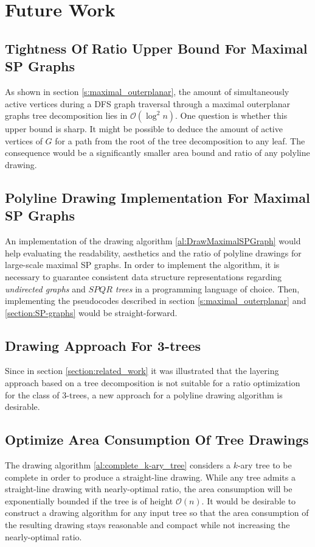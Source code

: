 \section{Future Work}\label{section:future_work}

\subsection*{Tightness Of Ratio Upper Bound For Maximal SP Graphs}

As shown in section \ref{s:maximal_outerplanar}, the amount of simultaneously active vertices during a DFS graph traversal through a maximal outerplanar graphs tree decomposition lies in $\mathcal{O}(\log^2 n)$. One question is whether this upper bound is sharp. It might be possible to deduce the amount of active vertices of $G$ for a path from the root of the tree decomposition to any leaf. The consequence would be a significantly smaller area bound and ratio of any polyline drawing.

\subsection*{Polyline Drawing Implementation For Maximal SP Graphs}

An implementation of the drawing algorithm \ref{al:DrawMaximalSPGraph} would help evaluating the readability, aesthetics and the ratio of polyline drawings for large-scale maximal SP graphs. In order to implement the algorithm, it is necessary to guarantee consistent data structure representations regarding \emph{undirected graphs} and \emph{$SPQR$ trees} in a programming language of choice. Then, implementing the pseudocodes described in section \ref{s:maximal_outerplanar} and \ref{section:SP-graphs} would be straight-forward.

\subsection*{Drawing Approach For 3-trees}

Since in section \ref{section:related_work} it was illustrated that the layering approach based on a tree decomposition is not suitable for a ratio optimization for the class of 3-trees, a new approach for a polyline drawing algorithm is desirable.

\subsection*{Optimize Area Consumption Of Tree Drawings}

The drawing algorithm \ref{al:complete_k-ary_tree} considers a $k$-ary tree to be complete in order to produce a straight-line drawing. While any tree admits a straight-line drawing with nearly-optimal ratio, the area consumption will be exponentially bounded if the tree is of height $\mathcal{O}(n)$. It would be desirable to construct a drawing algorithm for any input tree so that the area consumption of the resulting drawing stays reasonable and compact while not increasing the nearly-optimal ratio.